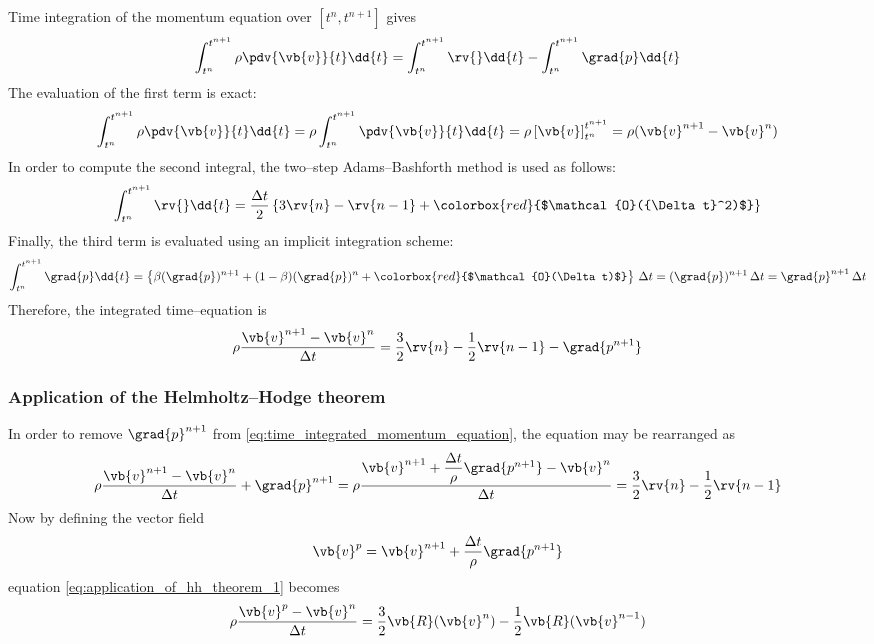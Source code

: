 Time integration of the momentum equation over $[t^n, t^{n+1}]$ gives
\begin{equation*}
    \int_{t^n}^{t^{n+1}} \rho \pdv{\vb{v}}{t} \dd{t} =
    \int_{t^n}^{t^{n+1}} \rv{} \dd{t} -
    \int_{t^n}^{t^{n+1}} \grad{p} \dd{t}
\end{equation*}
The evaluation of the first term is exact:
\begin{equation*}
    \int_{t^n}^{t^{n+1}} \rho \pdv{\vb{v}}{t} \dd{t} =
    \rho \int_{t^n}^{t^{n+1}} \pdv{\vb{v}}{t} \dd{t} =
    \rho \left[ \vb{v} \right]_{t^n}^{t^{n+1}} = \rho (\vb{v}^{n+1} - \vb{v}^n)
\end{equation*}
In order to compute the second integral, the two--step Adams--Bashforth method is used as follows:
\begin{equation*}
    \int_{t^n}^{t^{n+1}} \rv{} \dd{t} =
    \frac{\Delta t}{2}
    \left\{ 3 \rv{n} - \rv{n-1} + \colorbox{red}{$\mathcal{O}({\Delta t}^2)$} \right\}
\end{equation*}
Finally, the third term is evaluated using an implicit integration scheme:
\begin{equation*}
    \int_{t^n}^{t^{n+1}} \grad{p} \dd{t} =
    \left\{ \beta (\grad{p})^{n+1} + (1 - \beta) (\grad{p})^n + \colorbox{red}{$\mathcal{O}(\Delta t)$} \right\} \, \Delta t =
    (\grad{p})^{n+1} \, \Delta t =
    \grad{p}^{n+1} \, \Delta t
\end{equation*}
Therefore, the integrated time--equation is
\begin{equation} \label{eq:time_integrated_momentum_equation}
    \rho \frac{\vb{v}^{n+1} - \vb{v}^n}{\Delta t} =
    \frac{3}{2} \rv{n} - \frac{1}{2} \rv{n-1} - \grad{p^{n+1}}
\end{equation}

\subsubsection*{Application of the Helmholtz--Hodge theorem}

In order to remove $\grad{p}^{n+1}$ from \eqref{eq:time_integrated_momentum_equation}, the equation may be rearranged as
\begin{equation} \label{eq:application_of_hh_theorem_1}
    \rho \frac{\vb{v}^{n+1} - \vb{v}^n}{\Delta t} + \grad{p}^{n+1} =
    \rho \frac{\vb{v}^{n+1} + \dfrac{\Delta t}{\rho} \grad{p^{n+1}} - \vb{v}^n}{\Delta t} =
    \frac{3}{2} \rv{n} - \frac{1}{2} \rv{n-1}
\end{equation}
Now by defining the vector field
\begin{equation} \label{eq:hh_decomposition_velocity_pressure}
    \vb{v}^p = \vb{v}^{n+1} + \dfrac{\Delta t}{\rho} \grad{p^{n+1}}
\end{equation}
equation \eqref{eq:application_of_hh_theorem_1} becomes
\begin{equation}
    \rho \frac{\vb{v}^p - \vb{v}^n}{\Delta t} =
    \frac{3}{2} \vb{R}(\vb{v}^n) - \frac{1}{2} \vb{R}(\vb{v}^{n-1})
\end{equation}

